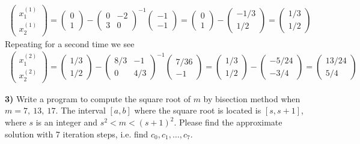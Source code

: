\documentclass[12pt,a4paper]{article}
\newcommand{\prob}[2]{\textbf{#1)} #2}
\begin{document}
\begin{align*}
\begin{pmatrix}
x_{1}^{(1)} \\ x_{2}^{(1)}
\end{pmatrix} 
=
\begin{pmatrix}
0 \\ 1
\end{pmatrix} 
-
\begin{pmatrix}
0 & -2 \\
3 & 0
\end{pmatrix}^{-1}
\begin{pmatrix}
-1 \\ -1
\end{pmatrix}
=
\begin{pmatrix}
0 \\ 1
\end{pmatrix} 
-
\begin{pmatrix}
-1/3 \\ 1/2
\end{pmatrix} 
=
\begin{pmatrix}
1/3 \\ 1/2
\end{pmatrix}
\end{align*}
Repeating for a second time we see
\begin{align*}
\begin{pmatrix}
x_{1}^{(2)} \\ x_{2}^{(2)}
\end{pmatrix} 
=
\begin{pmatrix}
1/3 \\ 1/2
\end{pmatrix} 
-
\begin{pmatrix}
8/3 & -1 \\
0 & 4/3
\end{pmatrix}^{-1}
\begin{pmatrix}
7/36 \\ -1
\end{pmatrix}
=
\begin{pmatrix}
1/3 \\ 1/2
\end{pmatrix} 
-
\begin{pmatrix}
-5/24 \\ -3/4
\end{pmatrix} 
=
\begin{pmatrix}
13/24 \\ 5/4
\end{pmatrix}
\end{align*}

\prob{3}{Write a program to compute the square root of $m$ by bisection method when $m = 7,~13,~17$. The interval $[a,b]$ where the square root is located is $[s,s+1]$, where $s$ is an integer and $s^2 < m < (s+1)^2$. Please find the approximate solution with 7 iteration steps, i.e. find $c_0,c_1,\hdots,c_7$.}
\end{document}

